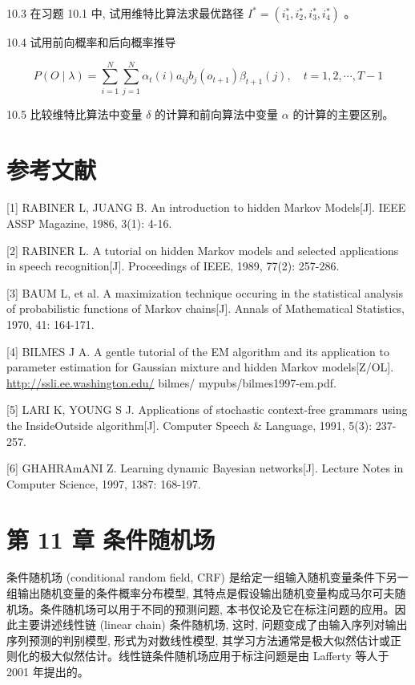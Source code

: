\documentclass[10pt]{article}
\begin{document}
\begin{CJK*}{UTF8}{bsmi}
10.3 在习题 10.1 中, 试用维特比算法求最优路径 $I^{*}=\left(i_{1}^{*}, i_{2}^{*}, i_{3}^{*}, i_{4}^{*}\right)$ 。

10.4 试用前向概率和后向概率推导

$$
P(O \mid \lambda)=\sum_{i=1}^{N} \sum_{j=1}^{N} \alpha_{t}(i) a_{i j} b_{j}\left(o_{t+1}\right) \beta_{t+1}(j), \quad t=1,2, \cdots, T-1
$$

10.5 比较维特比算法中变量 $\delta$ 的计算和前向算法中变量 $\alpha$ 的计算的主要区别。

\section*{参考文献}
[1] RABINER L, JUANG B. An introduction to hidden Markov Models[J]. IEEE ASSP Magazine, 1986, 3(1): 4-16.

[2] RABINER L. A tutorial on hidden Markov models and selected applications in speech recognition[J]. Proceedings of IEEE, 1989, 77(2): 257-286.

[3] BAUM L, et al. A maximization technique occuring in the statistical analysis of probabilistic functions of Markov chains[J]. Annals of Mathematical Statistics, 1970, 41: 164-171.

[4] BILMES J A. A gentle tutorial of the EM algorithm and its application to parameter estimation for Gaussian mixture and hidden Markov models[Z/OL]. \href{http://ssli.ee.washington.edu/}{http://ssli.ee.washington.edu/} bilmes/ mypubs/bilmes1997-em.pdf.

[5] LARI K, YOUNG S J. Applications of stochastic context-free grammars using the InsideOutside algorithm[J]. Computer Speech \& Language, 1991, 5(3): 237-257.

[6] GHAHRAmANI Z. Learning dynamic Bayesian networks[J]. Lecture Notes in Computer Science, 1997, 1387: 168-197.

\section*{第 11 章 条件随机场}
条件随机场 (conditional random field, CRF) 是给定一组输入随机变量条件下另一组输出随机变量的条件概率分布模型, 其特点是假设输出随机变量构成马尔可夫随机场。条件随机场可以用于不同的预测问题, 本书仅论及它在标注问题的应用。因此主要讲述线性链 (linear chain) 条件随机场, 这时, 问题变成了由输入序列对输出序列预测的判别模型, 形式为对数线性模型, 其学习方法通常是极大似然估计或正则化的极大似然估计。线性链条件随机场应用于标注问题是由 Lafferty 等人于 2001 年提出的。


\end{CJK*}
\end{document}
